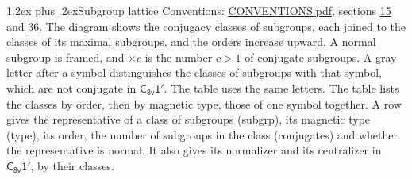 \documentclass[10pt,a4paper]{article}
\makeatletter
\renewcommand\section{\@startsection{section}{1}{\z@}{-3ex plus -1ex minus -.2ex}%
  {1.2ex plus .2ex}{\normalfont\large\sffamily\bfseries\color{parttitle}}}
\numberwithin{equation}{section}
\newcommand{\grp}[1]{\mathsf{#1}}
\makeatother
\begin{document}
\section{Subgroup lattice}\label{s:subgroups}
Conventions: \href{../../CONVENTIONS.pdf}{CONVENTIONS.pdf}, sections \href{../../../rotation/CONVENTIONS.pdf\#conv.15}{15} and \href{../../CONVENTIONS.pdf\#conv.36}{36}.
The diagram shows the conjugacy classes of subgroups, each joined to the classes of its maximal subgroups, and the orders increase upward. \label{n:index.conjugates.c}\label{n:mark.conjugates}A normal subgroup is framed, and ${\times}c$ is the number $c > 1$ of conjugate subgroups. \label{n:mark.letter}A gray letter after a symbol distinguishes the classes of subgroups with that symbol, which are not conjugate in $\grp{C_{8v}1'}$. The table uses the same letters. The table lists the classes by order, then by magnetic type, those of one symbol together. \label{n:head.subgroup}\label{n:head.magnetic.type}\label{n:head.order}\label{n:head.conjugates}\label{n:head.normal}A row gives the representative of a class of subgroups (subgrp), its magnetic type (type), its order, the number of subgroups in the class (conjugates) and whether the representative is normal. \label{n:head.normalizer}\label{n:head.centralizer}It also gives its normalizer and its centralizer in $\grp{C_{8v}1'}$, by their classes. 
\end{document}
